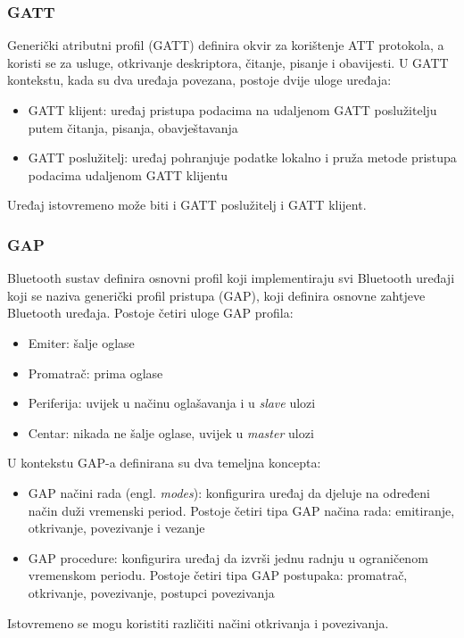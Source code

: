 \subsubsection{GATT}
Generički atributni profil (GATT) definira okvir za korištenje ATT protokola, a koristi se za usluge, otkrivanje deskriptora, čitanje, pisanje i obavijesti. U GATT kontekstu, kada su dva uređaja povezana, postoje dvije uloge uređaja:
\begin{itemize}
	\item GATT klijent: uređaj pristupa podacima na udaljenom GATT poslužitelju putem čitanja, pisanja, obavještavanja 
	\item  GATT poslužitelj: uređaj pohranjuje podatke lokalno i pruža metode pristupa podacima udaljenom GATT klijentu
\end{itemize}

Uređaj istovremeno može biti i GATT poslužitelj i GATT klijent.

\subsubsection{GAP}
Bluetooth sustav definira osnovni profil koji implementiraju svi Bluetooth uređaji koji se naziva generički profil pristupa (GAP), koji definira osnovne zahtjeve Bluetooth uređaja. Postoje četiri uloge GAP profila:
\begin{itemize}
	\item Emiter: šalje oglase
	\item Promatrač: prima oglase
	\item Periferija: uvijek u načinu oglašavanja i u \textit{slave} ulozi 
	\item Centar: nikada ne šalje oglase, uvijek u \textit{master} ulozi
\end{itemize}

U kontekstu GAP-a definirana su dva temeljna koncepta:
\begin{itemize}
	\item GAP načini rada (engl. \textit{modes}): konfigurira uređaj da djeluje na određeni način duži vremenski period. Postoje četiri tipa GAP načina rada: emitiranje, otkrivanje, povezivanje i vezanje
	\item GAP procedure: konfigurira uređaj da izvrši jednu radnju u ograničenom vremenskom periodu. Postoje četiri tipa GAP postupaka: promatrač, otkrivanje, povezivanje, postupci povezivanja
\end{itemize}

Istovremeno se mogu koristiti različiti načini otkrivanja i povezivanja.

